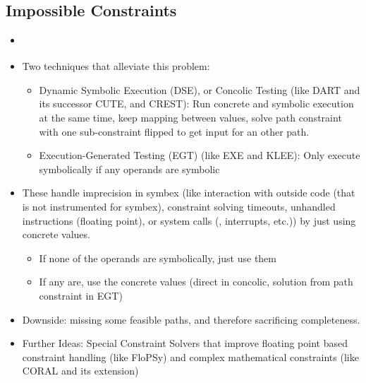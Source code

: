 \documentclass{article}
\begin{document}
\begin{multicols}{2}
    \subsection{Impossible Constraints}
    \begin{itemize}
        \item {}\cite{ReviewThreeDecades}
        \item Two techniques that alleviate this problem:
              \begin{itemize}
                  \item Dynamic Symbolic Execution (DSE), or Concolic Testing (like DART\cite{DART} and its successor CUTE\cite{CUTE}, and CREST\cite{CREST}): Run concrete and symbolic execution at the same time, keep mapping between values, solve path constraint with one sub-constraint flipped to get input for an other path. \cite{PreliminaryAssessment}
                  \item Execution-Generated Testing (EGT)\cite{EGT} (like EXE\cite{EXE} and KLEE\cite{KLEE}): Only execute symbolically if any operands are symbolic
              \end{itemize}
        \item These handle imprecision in symbex (like interaction with outside code (that is not instrumented for symbex), constraint solving timeouts, unhandled instructions (floating point), or system calls (, interrupts, etc.)) by just using concrete values.
              \begin{itemize}
                  \item If none of the operands are symbolically, just use them
                  \item If any are, use the concrete values (direct in concolic, solution from path constraint in EGT)
              \end{itemize}
        \item Downside: missing some feasible paths, and therefore sacrificing completeness.
        \item Further Ideas: Special Constraint Solvers that improve floating point based constraint handling (like FloPSy\cite{FloPSy}) and complex mathematical constraints (like CORAL\cite{CORAL} and its extension\cite{CORALAVM})
    \end{itemize}


\end{multicols}
\end{document}
